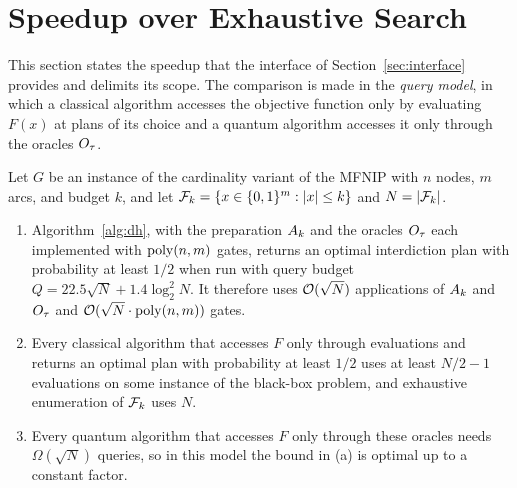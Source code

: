 \section{Speedup over Exhaustive Search}\label{sec:advantage}

This section states the speedup that the interface of Section~\ref{sec:interface} provides and delimits its scope. The comparison is made in the \emph{query model}, in which a classical algorithm accesses the objective function only by evaluating $F(x)$ at plans of its choice and a quantum algorithm accesses it only through the oracles $O_\tau$.

\begin{proposition}\label{prop:advantage}
Let $G$ be an instance of the cardinality variant of the MFNIP with $n$ nodes, $m$ arcs, and budget $k$, and let $\mathcal{F}_k=\{x\in\{0,1\}^m:|x|\le k\}$ and $N=|\mathcal{F}_k|$.
\begin{enumerate}
\item[(a)] Algorithm~\ref{alg:dh}, with the preparation $A_k$ and the oracles $O_\tau$ each implemented with $\operatorname{poly}(n,m)$ gates, returns an optimal interdiction plan with probability at least $1/2$ when run with query budget $Q=22.5\sqrt{N}+1.4\log_2^2 N$. It therefore uses $\mathcal{O}(\sqrt{N})$ applications of $A_k$ and $O_\tau$ and $\mathcal{O}(\sqrt{N}\cdot\operatorname{poly}(n,m))$ gates.
\item[(b)] Every classical algorithm that accesses $F$ only through evaluations and returns an optimal plan with probability at least $1/2$ uses at least $N/2-1$ evaluations on some instance of the black-box problem, and exhaustive enumeration of $\mathcal{F}_k$ uses $N$.
\item[(c)] Every quantum algorithm that accesses $F$ only through these oracles needs $\Omega(\sqrt{N})$ queries, so in this model the bound in (a) is optimal up to a constant factor.
\end{enumerate}
\end{proposition}

